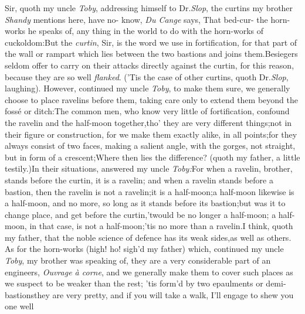 \documentclass{article}
\begin{document}
Sir, quoth my uncle \textit{Toby}, addressing himself to Dr.\@ \textit{Slop},\tsk 
the curtins my brother \textit{Shandy} mentions
here, have no-\break
{} know,
\textit{Du Cange} says, \lqq That bed-cur-
the horn-works he speaks of, any thing in the world to do with the
horn-works of cuckoldom:\tsk But the \textit{curtin}, Sir, is the
word we use in fortification, for that part of the wall or rampart
which lies between the two bastions and joins them.\tsh Be\-siegers
seldom offer to carry on their attacks directly against the curtin,
for this reason, because they are so well
\textit{flanked}.\break
(’Tis the case of other curtins, quoth Dr.\@ \textit{Slop}, laughing). 
However, continued my uncle \textit{Toby}, to
make them sure, we generally choose to place ravelins before them,
taking care only to extend them beyond the fossé or
ditch:\tsh The common men, who know very little of
fortification, confound the ravelin and the half-moon
together,\tsk tho’ they are very different
things;\tsk not in their figure or
construction, for we make them exactly alike, in all
points;\tsk for they always consist of two faces,
making a salient angle, with the gorges, not straight, but in form
of a crescent;\tsk Where then lies the difference? (quoth
my father, a little testily.)\tsk In their situations, answered
my uncle \textit{Toby:}\tsk For when a ravelin, brother, stands
before the curtin, it is a ravelin; and when a ravelin
stands before a bastion, then the ravelin is not a
ravelin;\tsk it is a half-moon;\tsk a half-moon likewise is a
half-moon, and no more, so long as it stands before its
bastion;\tsk but was it to change place, and get before
the curtin,\tsk ’twould be no longer a half-moon; a
half-moon, in that case, is not a half-moon;\tsk ’tis no
more than a ravelin.\tsk I think, quoth my father, that
the noble science of defence has its weak sides,\tsk as
well as others.\\
\newpage
\tsk As for the horn-works (high! ho! sigh’d my father)
which, continued my uncle \textit{Toby}, my brother was speaking of,
they are a very considerable part of an 
engineers, \textit{Ouvrage à
corne}, and we generally make them to cover such places as we
suspect to be weaker than the rest;\tsk\break 
’tis form’d by two
epaulments or demi-bastions\tsk they are very pretty, and
if you will take a walk, I’ll engage to shew you one well
\end{document}
